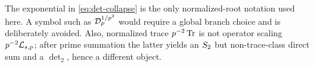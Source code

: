The exponential in \cref{eq:det-collapse} is the only normalized-root
notation used here.  A symbol such as \(\mathcal D_p^{1/p^2}\) would require a
global branch choice and is deliberately avoided.  Also, normalized trace
\(p^{-2}\operatorname{Tr}\) is not operator scaling \(p^{-2}\mathcal L_{s,p}\); after prime
summation the latter yields an \(S_{2}\) but non-trace-class direct sum
and a \(\det_2\), hence a different object.
